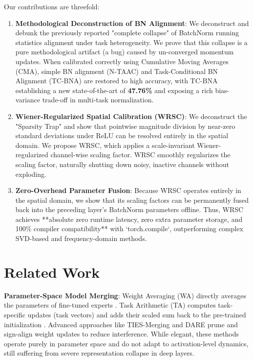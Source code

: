 \documentclass{article}
\theoremstyle{plain}
\theoremstyle{definition}
\theoremstyle{remark}
\begin{document}
Our contributions are threefold:
\begin{enumerate}
    \item \textbf{Methodological Deconstruction of BN Alignment}: We deconstruct and debunk the previously reported "complete collapse" of BatchNorm running statistics alignment under task heterogeneity. We prove that this collapse is a pure methodological artifact (a bug) caused by un-converged momentum updates. When calibrated correctly using Cumulative Moving Averages (CMA), simple BN alignment (N-TAAC) and Task-Conditional BN Alignment (TC-BNA) are restored to high accuracy, with TC-BNA establishing a new state-of-the-art of \textbf{47.76\%} and exposing a rich bias-variance trade-off in multi-task normalization.
    \item \textbf{Wiener-Regularized Spatial Calibration (WRSC)}: We deconstruct the "Sparsity Trap" and show that pointwise magnitude division by near-zero standard deviations under ReLU can be resolved entirely in the spatial domain. We propose WRSC, which applies a scale-invariant Wiener-regularized channel-wise scaling factor. WRSC smoothly regularizes the scaling factor, naturally shutting down noisy, inactive channels without exploding.
    \item \textbf{Zero-Overhead Parameter Fusion}: Because WRSC operates entirely in the spatial domain, we show that its scaling factors can be permanently fused back into the preceding layer's BatchNorm parameters offline. Thus, WRSC achieves **absolute zero runtime latency, zero extra parameter storage, and 100\% compiler compatibility** with `torch.compile`, outperforming complex SVD-based and frequency-domain methods.
\end{enumerate}

\section{Related Work}
\label{sec:related}
\textbf{Parameter-Space Model Merging}: Weight Averaging (WA) directly averages the parameters of fine-tuned experts \citep{Wortsman2022}. Task Arithmetic (TA) computes task-specific updates (task vectors) and adds their scaled sum back to the pre-trained initialization \citep{Ilharco2022}. Advanced approaches like TIES-Merging \citep{Yadav2023} and DARE \citep{Yu2024} prune and sign-align weight updates to reduce interference. While elegant, these methods operate purely in parameter space and do not adapt to activation-level dynamics, still suffering from severe representation collapse in deep layers.
\end{document}
